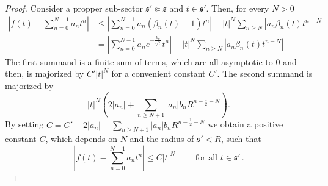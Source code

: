 \begin{proof}
  Consider a propper sub-sector $\mathfrak{s}'\Subset\mathfrak{s}$ and
  $t\in\mathfrak{s}'$. Then, for every $N>0$
  \begin{align*}
    \left|f(t)-\sum_{n=0}^{N-1} a_nt^n\right| 
    &\leq \left| \sum_{n=0}^{N-1}a_n(\beta_n(t)-1)t^n \right|
      +|t|^N\sum_{n\geq N}\left| a_n\beta_n(t)t^{n-N} \right|
  \\&= \left| \sum_{n=0}^{N-1}a_ne^{-\frac{b_n}{\sqrt{t}}}t^n \right|
      +|t|^N\sum_{n\geq N}\left| a_n\beta_n(t)t^{n-N} \right|
  \end{align*}
  The first summand is a finite sum of terms, which are all asymptotic to $0$
  and then, is majorized by $C'|t|^N$ for a convenient constant $C'$.
  The second summand is majorized by
  \[
    |t|^N\left(2|a_n|+\sum_{n\geq N+1}|a_n|b_nR^{n-\frac{1}{2}-N}\right).
  \]
  By setting $C=C'+2|a_n|+\sum_{n\geq N+1}|a_n|b_nR^{n-\frac{1}{2}-N}$ we
  obtain a positive constant $C$, which depends on $N$ and the radius of
  $\mathfrak{s}'<R$, such that 
  \[
    \left|f(t)-\sum_{n=0}^{N-1} a_nt^n\right| \leq C|t|^N
    \qquad\text{ for all } t\in\mathfrak{s}' \,.
  \]

\end{proof}

\begin{comment}
  \section{Sheaf definition from \cite{sabbah2007isomonodromic}}
  See \cite[II.5.c]{sabbah2007isomonodromic}.
  Let
  \begin{itemize}
    \item $D$ the open disc with coordinate $t$ centered at the origin and of
      radius $r^0>0$.
    \item $\tilde D:=[0,r^0[\times S^1$
    \item $\pi:\tilde D\to D,~(r,\theta)\mapsto t=re^{i\theta}$ 
  \end{itemize}
  \dots we can define the derivations $t\partial/\partial t$ and 
  $\bar t\partial/\partial\bar t$.
  \begin{defn}
    The sheaf of rings $\cA_{\tilde D}$ is defined as the subsheaf of
    $\sC_{\tilde D}^\infty$ of germs killed by $\bar t\partial/\partial\bar t$.
  \end{defn}
  \begin{rem}
    \cite{sabbah2007isomonodromic}: Remark 5.11
  \end{rem}
  \begin{rem}
    On the sheaf $\cA_{\tilde D}$ is defined the action of the derivation
    $\partial/\partial t$\dots
  \end{rem}
  \dots
\end{comment}
